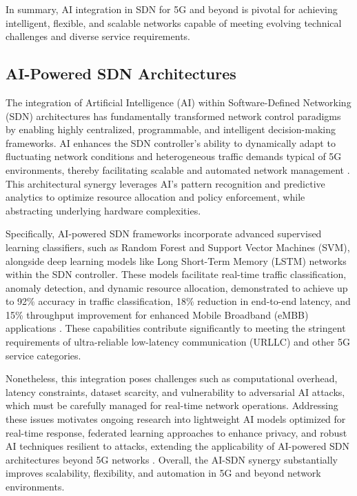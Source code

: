 \documentclass[sigconf]{acmart}
\begin{document}
In summary, AI integration in SDN for 5G and beyond is pivotal for achieving intelligent, flexible, and scalable networks capable of meeting evolving technical challenges and diverse service requirements.

\subsection{AI-Powered SDN Architectures}

The integration of Artificial Intelligence (AI) within Software-Defined Networking (SDN) architectures has fundamentally transformed network control paradigms by enabling highly centralized, programmable, and intelligent decision-making frameworks. AI enhances the SDN controller’s ability to dynamically adapt to fluctuating network conditions and heterogeneous traffic demands typical of 5G environments, thereby facilitating scalable and automated network management \cite{ref52}. This architectural synergy leverages AI’s pattern recognition and predictive analytics to optimize resource allocation and policy enforcement, while abstracting underlying hardware complexities.

Specifically, AI-powered SDN frameworks incorporate advanced supervised learning classifiers, such as Random Forest and Support Vector Machines (SVM), alongside deep learning models like Long Short-Term Memory (LSTM) networks within the SDN controller. These models facilitate real-time traffic classification, anomaly detection, and dynamic resource allocation, demonstrated to achieve up to 92\% accuracy in traffic classification, 18\% reduction in end-to-end latency, and 15\% throughput improvement for enhanced Mobile Broadband (eMBB) applications \cite{ref52}. These capabilities contribute significantly to meeting the stringent requirements of ultra-reliable low-latency communication (URLLC) and other 5G service categories.

Nonetheless, this integration poses challenges such as computational overhead, latency constraints, dataset scarcity, and vulnerability to adversarial AI attacks, which must be carefully managed for real-time network operations. Addressing these issues motivates ongoing research into lightweight AI models optimized for real-time response, federated learning approaches to enhance privacy, and robust AI techniques resilient to attacks, extending the applicability of AI-powered SDN architectures beyond 5G networks \cite{ref52}. Overall, the AI-SDN synergy substantially improves scalability, flexibility, and automation in 5G and beyond network environments.
\end{document}
